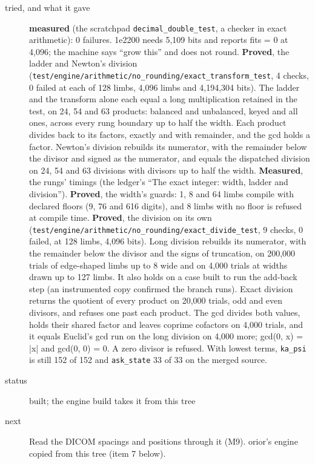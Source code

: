 \begin{description}
\item[{tried, and what it gave}] \textbf{measured} (the scratchpad \texttt{decimal\_\allowbreak{}double\_\allowbreak{}test}, a checker in exact arithmetic): 0 failures. 1e2200 needs 5,109 bits and reports fits = 0 at 4,096; the machine says “grow this” and does not round. \textbf{Proved}, the ladder and Newton's division (\texttt{test/\allowbreak{}engine/\allowbreak{}arithmetic/\allowbreak{}no\_\allowbreak{}rounding/\allowbreak{}exact\_\allowbreak{}transform\_\allowbreak{}test}, 4 checks, 0 failed at each of 128 limbs, 4,096 limbs and 4,194,304 bits). The ladder and the transform alone each equal a long multiplication retained in the test, on 24, 54 and 63 products: balanced and unbalanced, keyed and all ones, across every rung boundary up to half the width. Each product divides back to its factors, exactly and with remainder, and the gcd holds a factor. Newton's division rebuilds its numerator, with the remainder below the divisor and signed as the numerator, and equals the dispatched division on 24, 54 and 63 divisions with divisors up to half the width. \textbf{Measured}, the rungs' timings (the ledger's “The exact integer: width, ladder and division”). \textbf{Proved}, the width's guards: 1, 8 and 64 limbs compile with declared floors (9, 76 and 616 digits), and 8 limbs with no floor is refused at compile time. \textbf{Proved}, the division on its own (\texttt{test/\allowbreak{}engine/\allowbreak{}arithmetic/\allowbreak{}no\_\allowbreak{}rounding/\allowbreak{}exact\_\allowbreak{}divide\_\allowbreak{}test}, 9 checks, 0 failed, at 128 limbs, 4,096 bits). Long division rebuilds its numerator, with the remainder below the divisor and the signs of truncation, on 200,000 trials of edge-shaped limbs up to 8 wide and on 4,000 trials at widths drawn up to 127 limbs. It also holds on a case built to run the add-back step (an instrumented copy confirmed the branch runs). Exact division returns the quotient of every product on 20,000 trials, odd and even divisors, and refuses one past each product. The gcd divides both values, holds their shared factor and leaves coprime cofactors on 4,000 trials, and it equals Euclid's gcd run on the long division on 4,000 more; gcd(0, x) = |x| and gcd(0, 0) = 0. A zero divisor is refused. With lowest terms, \texttt{ka\_\allowbreak{}psi} is still 152 of 152 and \texttt{ask\_\allowbreak{}state} 33 of 33 on the merged source.
\item[{status}] built; the engine build takes it from this tree
\item[{next}] Read the DICOM spacings and positions through it (M9). orior's engine copied from this tree (item 7 below).
\end{description}

